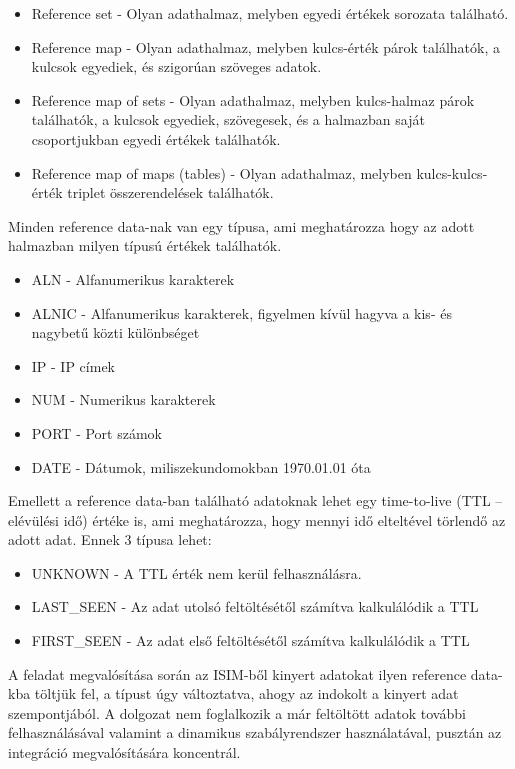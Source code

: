 \begin{itemize}
	\item Reference set - Olyan adathalmaz, melyben egyedi értékek sorozata található.
	\item Reference map - Olyan adathalmaz, melyben kulcs-érték párok találhatók, a kulcsok egyediek, és szigorúan szöveges adatok.
	\item Reference map of sets - Olyan adathalmaz, melyben kulcs-halmaz párok találhatók, a kulcsok egyediek, szövegesek, és a halmazban saját csoportjukban egyedi értékek találhatók.
	\item Reference map of maps (tables) - Olyan adathalmaz, melyben kulcs-kulcs-érték triplet összerendelések találhatók.
\end{itemize}

Minden reference data-nak van egy típusa, ami meghatározza hogy az adott halmazban milyen típusú értékek találhatók.

\begin{itemize}
	\item ALN - Alfanumerikus karakterek
	\item ALNIC - Alfanumerikus karakterek, figyelmen kívül hagyva a kis- és nagybetű közti különbséget 
	\item IP - IP címek
	\item NUM - Numerikus karakterek
	\item PORT - Port számok
	\item DATE - Dátumok, miliszekundomokban 1970.01.01 óta
\end{itemize}

Emellett a reference data-ban található adatoknak lehet egy time-to-live (TTL -- elévülési idő) értéke is, ami meghatározza, hogy mennyi idő elteltével törlendő az adott adat. Ennek 3 típusa lehet: 
\begin{itemize}
	\item UNKNOWN - A TTL érték nem kerül felhasználásra.
	\item LAST\_SEEN - Az adat utolsó feltöltésétől számítva kalkulálódik a TTL
	\item FIRST\_SEEN - Az adat első feltöltésétől számítva kalkulálódik a TTL
\end{itemize}

A feladat megvalósítása során az ISIM-ből kinyert adatokat ilyen reference data-kba töltjük fel, a típust úgy változtatva, ahogy az indokolt a kinyert adat szempontjából. A dolgozat nem foglalkozik a már feltöltött adatok további felhasználásával valamint a dinamikus szabályrendszer használatával, pusztán az integráció megvalósítására koncentrál.

